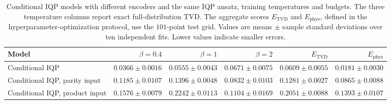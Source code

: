 \begin{table}[t]
\centering
\small
\caption{Conditional IQP models with different encoders and the same IQP ansatz, training temperatures and budgets. The three temperature columns report exact full-distribution TVD. The aggregate scores $E_{\mathrm{TVD}}$ and $E_{\mathrm{phys}}$, defined in the hyperparameter-optimization protocol, use the $101$-point test grid. Values are means $\pm$ sample standard deviations over ten independent fits. Lower values indicate smaller errors.}
\label{tab:cw_encoder_comparison}
\begin{tabular}{lrrrrr}
\toprule
Model & $\beta=0.4$ & $\beta=1$ & $\beta=2$ & $E_{\mathrm{TVD}}$ & $E_{\mathrm{phys}}$ \\
\midrule
Conditional IQP & $0.0366\pm0.0016$ & $0.0555\pm0.0043$ & $0.0671\pm0.0075$ & $0.0609\pm0.0055$ & $0.0181\pm0.0030$ \\
Conditional IQP, parity input & $0.1185\pm0.0107$ & $0.1396\pm0.0048$ & $0.0832\pm0.0103$ & $0.1281\pm0.0027$ & $0.0865\pm0.0088$ \\
Conditional IQP, product input & $0.1576\pm0.0079$ & $0.2242\pm0.0113$ & $0.1104\pm0.0169$ & $0.2051\pm0.0088$ & $0.1393\pm0.0107$ \\
\bottomrule
\end{tabular}
\end{table}

